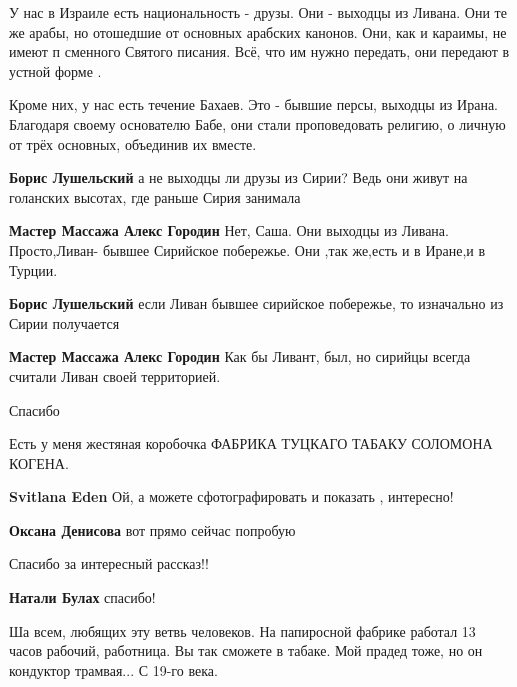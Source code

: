 \begin{itemize}
\begin{itemize}
У нас в Израиле есть национальность - друзы. Они - выходцы из Ливана. Они те же
арабы, но отошедшие от основных арабских канонов. Они, как и караимы, не имеют п
сменного Святого писания. Всё, что им нужно передать, они передают в устной форме
.

Кроме них, у нас есть течение Бахаев. Это - бывшие персы, выходцы из Ирана.
Благодаря своему основателю Бабе, они стали проповедовать религию, о личную от
трёх основных, объединив их вместе.

\begin{itemize} %
\textbf{Борис Лушельский} а не выходцы ли друзы из Сирии? Ведь они живут на голанских высотах, где раньше Сирия занимала

\textbf{Мастер Массажа Алекс Городин}
Нет, Саша. Они выходцы из Ливана. Просто,Ливан- бывшее Сирийское побережье. Они ,так же,есть и в Иране,и в Турции.

\textbf{Борис Лушельский} если Ливан бывшее сирийское побережье, то изначально из Сирии получается
\end{itemize} %

\textbf{Мастер Массажа Алекс Городин}
Как бы Ливант, был, но сирийцы всегда считали Ливан своей территорией.

\end{itemize} %

Спасибо

Есть у меня жестяная коробочка ФАБРИКА ТУЦКАГО ТАБАКУ СОЛОМОНА КОГЕНА.

\begin{itemize} %
\textbf{Svitlana Eden} Ой, а можете сфотографировать и показать , интересно!

\textbf{Оксана Денисова} вот прямо сейчас попробую
\end{itemize} %

Спасибо за интересный рассказ!!

\begin{itemize} %
\textbf{Натали Булах} спасибо!
\end{itemize} %


Ша всем, любящих эту ветвь человеков. На папиросной фабрике работал 13 часов
рабочий, работница. Вы так сможете в табаке. Мой прадед тоже, но он кондуктор
трамвая... С 19-го века.


\end{itemize}

